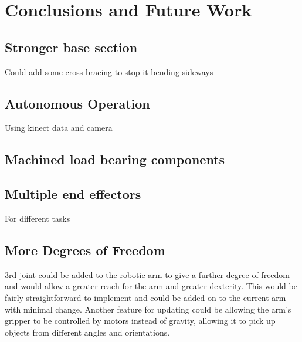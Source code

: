 \section{Conclusions and Future Work}
\subsection{Stronger base section}
Could add some cross bracing to stop it bending sideways
\subsection{Autonomous Operation}
Using kinect data and camera
\subsection{Machined load bearing components}
\subsection{Multiple end effectors}
For different tasks

\subsection{More Degrees of Freedom} 3rd joint could be added to the robotic arm to give a further degree of freedom and would allow a greater reach for the arm and greater dexterity.  This would be fairly straightforward to implement and could be added on to the current arm with minimal change.  Another feature for updating could be allowing the arm’s gripper to be controlled by motors instead of gravity, allowing it to pick up objects from different angles and orientations.  